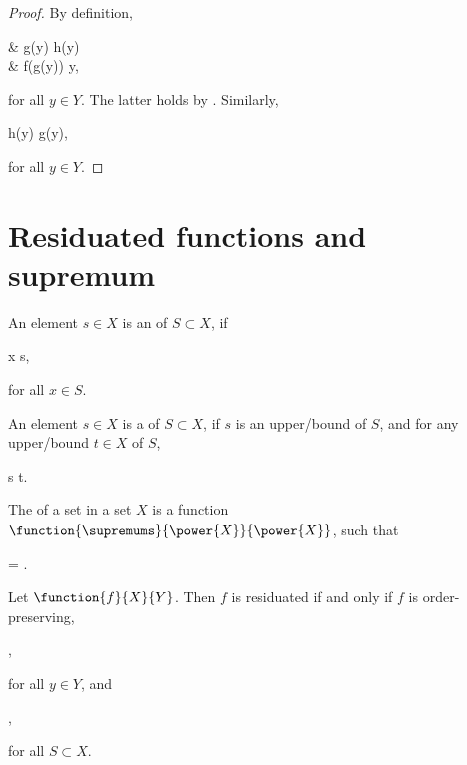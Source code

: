 \documentclass[b5paper, english, oneside]{memoir}
\begin{document}
\begin{proof}
By definition,
\begin{eqs}
{} & g(y) \preleq h(y) \\
\iffr & f(g(y)) \preleqb y,
\end{eqs}
for all $y \in Y$. The latter holds by . Similarly,
\begin{eqs}
h(y) \preleq g(y),
\end{eqs}
for all $y \in Y$. 
\end{proof}

\section{Residuated functions and supremum}

\begin{definition}
An element $s \in X$ is an  of $S \subset X$, if
\begin{eqs}
x \preleq s,
\end{eqs}
for all $x \in S$.
\end{definition}

\begin{definition}
An element $s \in X$ is a  of $S \subset X$, if $s$ is an upper\-/bound of $S$, and for any upper\-/bound $t \in X$ of $S$,
\begin{eqs}
s \preleq t.
\end{eqs}
\end{definition}

\begin{definition}[Supremum]
The  of a set in a set $X$ is a function $\function{\supremums}{\power{X}}{\power{X}}$, such that
\begin{eqs}
 = .
\end{eqs}
\end{definition}

\begin{theorem}
\label{ResiduatedPropertyBySupremum}
Let $\function{f}{X}{Y}$. Then $f$ is residuated if and only if $f$ is order-preserving,
\begin{eqs}
 \neq \emptyset,
\end{eqs}
for all $y \in Y$, and
\begin{eqs}
 \subset {},
\end{eqs}
for all $S \subset X$.
\end{theorem}
\end{document}
